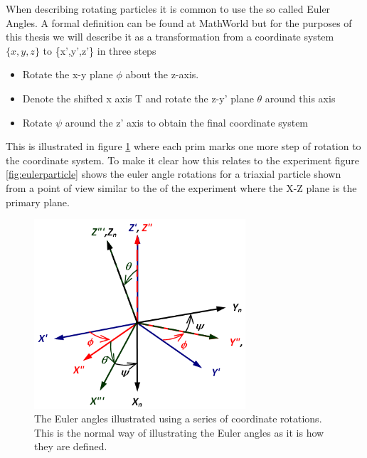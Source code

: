When describing rotating particles it is common to use the so called Euler Angles. A formal definition can be found at MathWorld \cite{eulerAngles} but for the purposes of this thesis we will describe it as a transformation from a coordinate system $\{x,y,z\}$ to \{x',y',z'\} in three steps

\begin{itemize}
\item Rotate the x-y plane $\phi$ about the z-axis.
\item Denote the shifted x axis T and rotate the z-y' plane $\theta$ around this axis
\item Rotate $\psi$ around the z' axis to obtain the final coordinate system
\end{itemize}

This is illustrated in figure \ref{fig:eulerangles} where each prim marks one more step of rotation to the coordinate system. To make it clear how this relates to the experiment figure \ref{fig:eulerparticle} shows the euler angle rotations for a triaxial particle shown from a point of view similar to the of the experiment where the X-Z plane is the primary plane. 

\begin{figure}
\begin{center}
\includegraphics[width=0.7\textwidth]{figures/theory/eulerangles.png}
\end{center}
\caption{The Euler angles illustrated using a series of coordinate rotations. This is the normal way of illustrating the Euler angles as it is how they are defined.}
\label{fig:eulerangles}
\end{figure}


